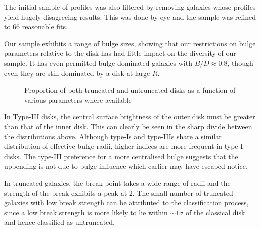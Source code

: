 The initial sample of profiles was also filtered by removing galaxies whose profiles yield hugely disagreeing results. This was done by eye and the sample was refined to 66 reasonable fits. 

Our sample exhibits a range of bulge sizes, showing that our restrictions on bulge parameters relative to the disk has had little impact on the diversity of our sample. It has even permitted bulge-dominated galaxies with $B/D \approx 0.8$, though even they are still dominated by a disk at large $R$.

\begin{figure}
	\caption{Proportion of both truncated and untruncated disks as a function of various parameters where available}
	\label{fig: prop_hist}
\end{figure}


In Type-III disks, the central surface brightness of the outer disk must be greater than that of the inner disk. This can clearly be seen in the sharp divide between the distributions above. Although type-Is and type-IIIs share a similar distribution of effective bulge radii, higher \sersic indices are more frequent in type-I disks. The type-III preference for a more centralised bulge suggests that the upbending is not due to bulge influence which earlier may have escaped notice. 

In truncated galaxies, the break point takes a wide range of radii and the strength of the break exhibits a peak at 2. The small number of truncated galaxies with low break strength can be attributed to the classification process, since a low break strength is more likely to lie within $\sim 1\sigma$ of the classical disk and hence classified as untruncated. 

